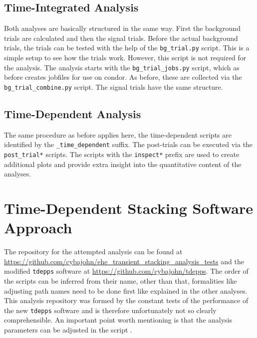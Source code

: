 \subsection{Time-Integrated Analysis}

Both analyses are basically structured in the same way.
First the background trials are calculated and then the signal trials.
Before the actual background trials, the trials can be tested with the help of the \texttt{bg\_trial.py} script.
This is a simple setup to see how the trials work.
However, this script is not required for the analysis.
The analysis starts with the \texttt{bg\_trial\_jobs.py} script, which as before creates jobfiles for use on condor.
As before, these are collected via the \texttt{bg\_trial\_combine.py} script.
The signal trials have the same structure.

\subsection{Time-Dependent Analysis}

The same procedure as before applies here, the time-dependent scripts are identified by the \texttt{\_time\_dependent} suffix.
The post-trials can be executed via the \texttt{post\_trial*} scripts.
The scripts with the \texttt{inspect*} prefix are used to create additional plots and provide extra insight into the quantitative content of the analyses.

\section{Time-Dependent Stacking Software Approach}

The repository for the attempted analysis can be found at \url{https://github.com/cybajohn/ehe_transient_stacking_analysis_tests} and the modified \texttt{tdepps} software at \url{https://github.com/cybajohn/tdepps}.
The order of the scripts can be inferred from their name, other than that, formalities like adjusting path names need to be done first like explained in the other analyses.
This analysis repository was formed by the constant tests of the performance of the new \texttt{tdepps} software and is therefore unfortunately not so clearly comprehensible.
An important point worth mentioning is that the analysis parameters can be adjusted in the script .
